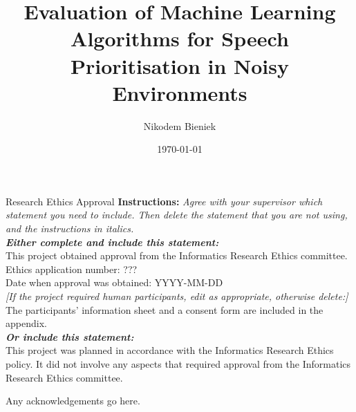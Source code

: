 \documentclass[logo,bsc,singlespacing,parskip,online]{infthesis}
\begin{document}
\begin{preliminary}

\title{Evaluation of Machine Learning Algorithms for Speech Prioritisation in Noisy Environments}

\author{Nikodem Bieniek}




\date{\today}


\maketitle

\newenvironment{ethics}
   {\begin{frontenv}{Research Ethics Approval}{\LARGE}}
   {\end{frontenv}\newpage}

\begin{ethics}
\textbf{Instructions:} \emph{Agree with your supervisor which
statement you need to include. Then delete the statement that you are not using,
and the instructions in italics.\\
\textbf{Either complete and include this statement:}}\\ %
%
This project obtained approval from the Informatics Research Ethics committee.\\
Ethics application number: ???\\
Date when approval was obtained: YYYY-MM-DD\\
%
\emph{[If the project required human participants, edit as appropriate, otherwise delete:]}\\ %
The participants' information sheet and a consent form are included in the appendix.\\
%
\textbf{\emph{Or include this statement:}}\\ %
This project was planned in accordance with the Informatics Research
Ethics policy. It did not involve any aspects that required approval
from the Informatics Research Ethics committee.

\standarddeclaration
\end{ethics}


\begin{acknowledgements}
Any acknowledgements go here.
\end{acknowledgements}


\tableofcontents
\end{preliminary}
\end{document}
